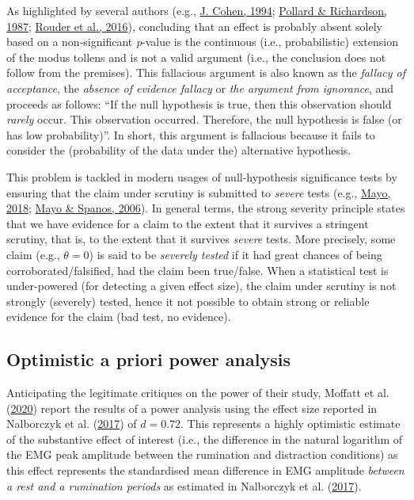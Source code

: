 \documentclass[
  man, donotrepeattitle,floatsintext]{apa6}
\begin{document}
As highlighted by several authors (e.g., \protect\hyperlink{ref-cohen_earth_1994}{J. Cohen, 1994}; \protect\hyperlink{ref-pollard_probability_1987}{Pollard \& Richardson, 1987}; \protect\hyperlink{ref-rouder_is_2016}{Rouder et al., 2016}), concluding that an effect is probably absent solely based on a non-significant \emph{p}-value is the continuous (i.e., probabilistic) extension of the modus tollens and is not a valid argument (i.e., the conclusion does not follow from the premises). This fallacious argument is also known as the \emph{fallacy of acceptance}, the \emph{absence of evidence fallacy} or \emph{the argument from ignorance}, and proceeds as follows: ``If the null hypothesis is true, then this observation should \emph{rarely} occur. This observation occurred. Therefore, the null hypothesis is false (or has low probability)''. In short, this argument is fallacious because it fails to consider the (probability of the data under the) alternative hypothesis.

This problem is tackled in modern usages of null-hypothesis significance tests by ensuring that the claim under scrutiny is submitted to \emph{severe} tests (e.g., \protect\hyperlink{ref-mayo_statistical_2018}{Mayo, 2018}; \protect\hyperlink{ref-mayo_severe_2006}{Mayo \& Spanos, 2006}). In general terms, the strong severity principle states that we have evidence for a claim to the extent that it survives a stringent scrutiny, that is, to the extent that it survives \emph{severe} tests. More precisely, some claim (e.g., \(\theta = 0\)) is said to be \emph{severely tested} if it had great chances of being corroborated/falsified, had the claim been true/false. When a statistical test is under-powered (for detecting a given effect size), the claim under scrutiny is not strongly (severely) tested, hence it not possible to obtain strong or reliable evidence for the claim (bad test, no evidence).

\hypertarget{optimistic-a-priori-power-analysis}{%
\subsection{Optimistic a priori power analysis}\label{optimistic-a-priori-power-analysis}}

Anticipating the legitimate critiques on the power of their study, Moffatt et al. (\protect\hyperlink{ref-moffatt_inner_2020}{2020}) report the results of a power analysis using the effect size reported in Nalborczyk et al. (\protect\hyperlink{ref-nalborczyk_orofacial_2017}{2017}) of \(d = 0.72\). This represents a highly optimistic estimate of the substantive effect of interest (i.e., the difference in the natural logarithm of the EMG peak amplitude between the rumination and distraction conditions) as this effect represents the standardised mean difference in EMG amplitude \emph{between a rest and a rumination periods} as estimated in Nalborczyk et al. (\protect\hyperlink{ref-nalborczyk_orofacial_2017}{2017}).
\end{document}
